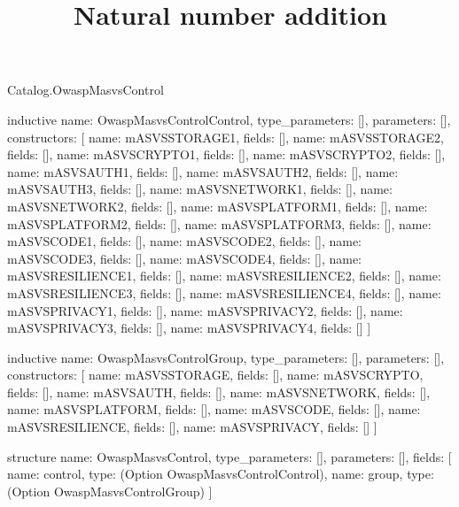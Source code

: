 \begin{lexlean}{Catalog.OwaspMasvsControl}
\title{Natural number addition}
\begin{semanticmodule}
inductive{
  name: OwaspMasvsControlControl,
  type_parameters: [],
  parameters: [],
  constructors: [
    {name: mASVSSTORAGE1, fields: []},
    {name: mASVSSTORAGE2, fields: []},
    {name: mASVSCRYPTO1, fields: []},
    {name: mASVSCRYPTO2, fields: []},
    {name: mASVSAUTH1, fields: []},
    {name: mASVSAUTH2, fields: []},
    {name: mASVSAUTH3, fields: []},
    {name: mASVSNETWORK1, fields: []},
    {name: mASVSNETWORK2, fields: []},
    {name: mASVSPLATFORM1, fields: []},
    {name: mASVSPLATFORM2, fields: []},
    {name: mASVSPLATFORM3, fields: []},
    {name: mASVSCODE1, fields: []},
    {name: mASVSCODE2, fields: []},
    {name: mASVSCODE3, fields: []},
    {name: mASVSCODE4, fields: []},
    {name: mASVSRESILIENCE1, fields: []},
    {name: mASVSRESILIENCE2, fields: []},
    {name: mASVSRESILIENCE3, fields: []},
    {name: mASVSRESILIENCE4, fields: []},
    {name: mASVSPRIVACY1, fields: []},
    {name: mASVSPRIVACY2, fields: []},
    {name: mASVSPRIVACY3, fields: []},
    {name: mASVSPRIVACY4, fields: []}
  ]
}

inductive{
  name: OwaspMasvsControlGroup,
  type_parameters: [],
  parameters: [],
  constructors: [
    {name: mASVSSTORAGE, fields: []},
    {name: mASVSCRYPTO, fields: []},
    {name: mASVSAUTH, fields: []},
    {name: mASVSNETWORK, fields: []},
    {name: mASVSPLATFORM, fields: []},
    {name: mASVSCODE, fields: []},
    {name: mASVSRESILIENCE, fields: []},
    {name: mASVSPRIVACY, fields: []}
  ]
}

structure{
  name: OwaspMasvsControl,
  type_parameters: [],
  parameters: [],
  fields: [
    {name: control, type: (Option OwaspMasvsControlControl)},
    {name: group, type: (Option OwaspMasvsControlGroup)}
  ]
}
\end{semanticmodule}
\end{lexlean}
